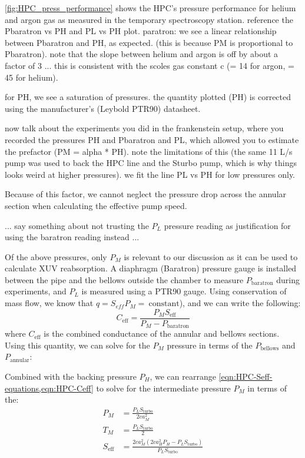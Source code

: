 \cref{fig:HPC_press_performance} shows the HPC's pressure performance for helium and argon gas as measured in the temporary spectroscopy station. reference the Pbaratron vs PH and PL vs PH plot.
paratron: we see a linear relationship between Pbaratron and PH, as expected. (this is because PM is proportional to Pbaratron). note that the slope between helium and argon is off by about a factor of 3 ... this is consistent with the scoles gas constant c (= 14 for argon, = 45 for helium).

for PH, we see a saturation of pressures. the quantity plotted (PH) is corrected using the manufacturer's (Leybold PTR90) datasheet. 

now talk about the experiments you did in the frankenstein setup, where you recorded the pressures PH and Pbaratron and PL, which allowed you to estimate the prefactor (PM = alpha * PH). note the limitations of this (the same 11 L/s pump was used to back the HPC line and the Sturbo pump, which is why things looks weird at higher pressures). we fit the line PL vs PH for low pressures only.


Because of this factor, we cannot neglect the pressure drop across the annular section when calculating the effective pump speed.

... say something about not trusting the $P_L$ pressure reading as justification for using the baratron reading instead ...

Of the above pressures, only $P_M$ is relevant to our discussion as it can be used to calculate XUV reabsorption. A diaphragm (Baratron) pressure gauge is installed between the pipe and the bellows outside the chamber to measure $P_{\textrm{baratron}}$ during experiments, and $P_L$ is measured using a PTR90 gauge. Using conservation of mass flow, we know that $q = S_{eff} P_M = \ \textrm{constant}$), and we can write the following:
\begin{equation}
C_{\textrm{eff}} = \frac{P_M S_{\textrm{eff}}}{P_M - P_{\textrm{baratron}}}
\label{eqn:HPC-Ceff}
\end{equation}
where $C_{\textrm{eff}}$ is the combined conductance of the annular and bellows sections. Using this quantity, we can solve for the $P_M$ pressure in terms of the $P_{\textrm{bellows}}$ and $P_{\textrm{annular}}$:

Combined with the backing pressure $P_H$, we can rearrange \cref{eqn:HPC-Seff-equations,eqn:HPC-Ceff} to solve for the intermediate pressure $P_M$ in terms of the:
\begin{equation}
\begin{aligned}
P_M &= \frac{P_L S_{\textrm{turbo}}}{2 c a_M^2} \\
T_M &= \frac{P_L S_{\textrm{turbo}}}{2} \\
S_{\textrm{eff}} &= \frac{2 c a_M^2 (2 c a_H^2 P_H - P_L S_{\textrm{turbo}})}{P_L S_{\textrm{turbo}}}
\end{aligned}
\end{equation}


